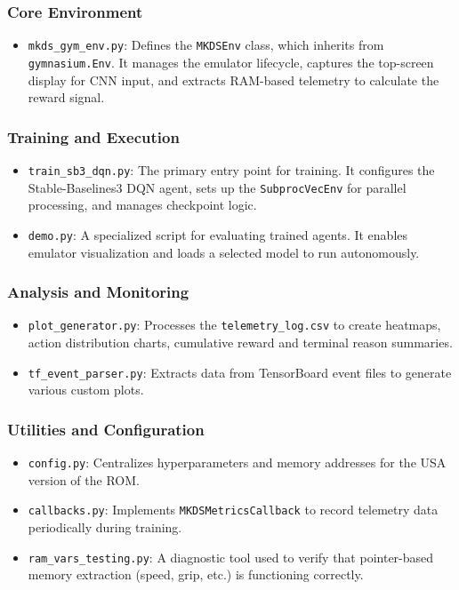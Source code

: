 \documentclass[11pt,a4paper]{article}
\begin{document}
\subsubsection{Core Environment}
\begin{itemize}
    \item \texttt{mkds\_gym\_env.py}: Defines the \texttt{MKDSEnv} class, which inherits from \texttt{gymnasium.Env}. It manages the emulator lifecycle, captures the top-screen display for CNN input, and extracts RAM-based telemetry to calculate the reward signal.
\end{itemize}

\subsubsection{Training and Execution}
\begin{itemize}
    \item \texttt{train\_sb3\_dqn.py}: The primary entry point for training. It configures the Stable-Baselines3 DQN agent, sets up the \texttt{SubprocVecEnv} for parallel processing, and manages checkpoint logic.
    \item \texttt{demo.py}: A specialized script for evaluating trained agents. It enables emulator visualization and loads a selected model to run autonomously.
\end{itemize}

\subsubsection{Analysis and Monitoring}
\begin{itemize}
    \item \texttt{plot\_generator.py}: Processes the \texttt{telemetry\_log.csv} to create heatmaps, action distribution charts, cumulative reward and terminal reason summaries.
    \item \texttt{tf\_event\_parser.py}: Extracts data from TensorBoard event files to generate various custom plots.
\end{itemize}

\subsubsection{Utilities and Configuration}
\begin{itemize}
    \item \texttt{config.py}: Centralizes hyperparameters and memory addresses for the USA version of the ROM.
    \item \texttt{callbacks.py}: Implements \texttt{MKDSMetricsCallback} to record telemetry data periodically during training.
    \item \texttt{ram\_vars\_testing.py}: A diagnostic tool used to verify that pointer-based memory extraction (speed, grip, etc.) is functioning correctly.
\end{itemize}
\end{document}
